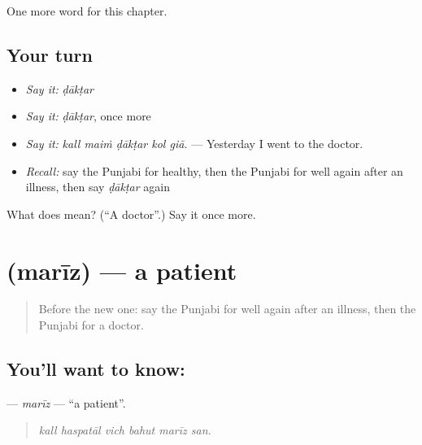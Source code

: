 \begin{grammarlens}[title={What you've built}]
One more word for this chapter.
\end{grammarlens}

\subsection*{Your turn}
\begin{itemize}
\raggedright
  \item \emph{Say it:} \emph{ḍākṭar}
  \item \emph{Say it:} \emph{ḍākṭar}, once more
  \item \emph{Say it:} \emph{kall maiṁ ḍākṭar kol giā.} — Yesterday I went to the doctor.
  \item \emph{Recall:} say the Punjabi for healthy, then the Punjabi for well again after an illness, then say \emph{ḍākṭar} again
\end{itemize}

\begin{tcolorbox}[breakable,colback=teal!4,colframe=teal!35!black,title={Before you move on}]
What does  mean? (\textquotedblleft{}A doctor\textquotedblright{}.) Say it once more.
\end{tcolorbox}
\section[\texorpdfstring{\pa{ਮਰੀਜ਼} (marīz)}{ਮਰੀਜ਼ (marīz)}]{ (marīz) — a patient}

\label{lesson:PA-C320-mariz}



\begin{quote}
Before the new one: say the Punjabi for well again after an illness, then the Punjabi for a doctor.
\end{quote}

\subsection*{You'll want to know: }
\textbf{} — \emph{marīz} — \textquotedblleft{}a patient\textquotedblright{}.

\begin{quote}
     
\end{quote}

\begin{quote}
\emph{kall haspatāl vich bahut marīz san.}
\end{quote}


